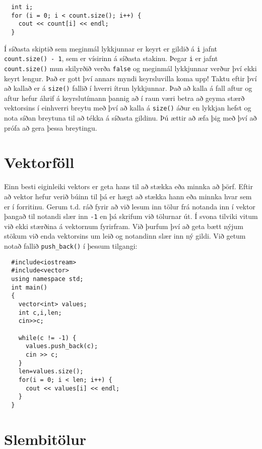\begin{verbatim}
  int i;
  for (i = 0; i < count.size(); i++) {
    cout << count[i] << endl;
  }
\end{verbatim}
%
Í síðasta skiptið sem meginmál lykkjunnar er keyrt er gildið á {\tt i} jafnt {\tt count.size() - 1}, sem er vísirinn á síðasta stakinu.
Þegar {\tt i} er jafnt {\tt count.size()} mun skilyrðið verða {\tt false} og meginmál lykkjunnar verður því ekki keyrt lengur.
Það er gott því annars myndi keyrsluvilla koma upp!
Taktu eftir því að kallað er á {\tt size()} fallið í hverri ítrun lykkjunnar.
Það að kalla á fall aftur og aftur hefur áhrif á keyrslutímann þannig að í raun væri betra að geyma stærð vektorsins í einhverri breytu með því að kalla á 
{\tt size()} áður en lykkjan hefst og nota síðan breytuna til að tékka á síðasta gildinu.
Þú ættir að æfa þig með því að prófa að gera þessa breytingu.

\section{Vektorföll}

Einn besti eiginleiki vektors er geta hans til að stækka eða minnka að þörf.
Eftir að vektor hefur verið búinn til þá er hægt að stækka hann eða minnka hvar sem er í forritinu.
Gerum t.d. ráð fyrir að við lesum inn tölur frá notanda inn í vektor þangað til notandi slær inn {\tt -1} en þá skrifum við tölurnar út.
Í svona tilviki vitum við ekki stærðina á vektornum fyrirfram.
Við þurfum því að geta bætt nýjum stökum við enda vektorsins um leið og notandinn slær inn ný gildi.
Við getum notað fallið {\tt push\_back()} í þessum tilgangi:

\begin{verbatim}
  #include<iostream>
  #include<vector>
  using namespace std;
  int main()
  {
    vector<int> values;
    int c,i,len;
    cin>>c;
    
    while(c != -1) {
      values.push_back(c);
      cin >> c;
    }
    len=values.size();
    for(i = 0; i < len; i++) {
      cout << values[i] << endl;
    }
  }

\end{verbatim}

\section{Slembitölur}
\label{random}
\label{pseudorandom}

